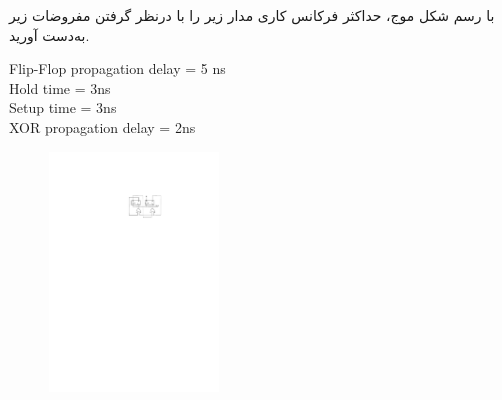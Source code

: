 
با رسم شکل موج، حداکثر فرکانس کاری مدار زیر را با درنظر گرفتن مفروضات زیر به‌دست آورید.

\begin{latin}
	Flip-Flop propagation delay = 5 ns\\
	Hold time = 3ns\\
	Setup time = 3ns\\
	XOR propagation delay = 2ns
\end{latin}


\begin{figure}[h]
	\centering
	\includegraphics[width=0.4\textwidth]{fig/Q_basic7.pdf}
	\label{fig:Q_basic_7}
\end{figure}
